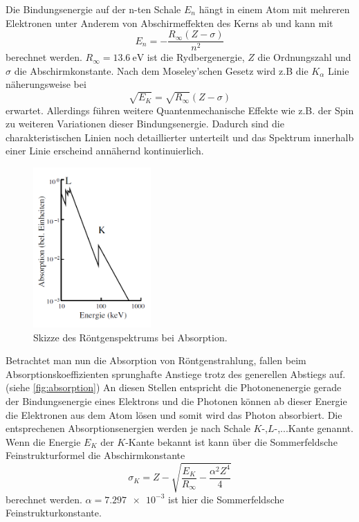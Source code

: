 Die Bindungsenergie auf der n-ten Schale $E_n$ hängt in einem Atom mit mehreren Elektronen unter Anderem von Abschirmeffekten des Kerns ab und kann mit
\begin{equation}
    E_n = -\frac{R_\infty(Z-\sigma)}{n^2}
\end{equation}
berechnet werden. 
$R_\infty=\SI{13.6}{\electronvolt}$ ist die Rydbergenergie, $Z$ die Ordnungszahl und $\sigma$ die Abschirmkonstante.\cite{V602}
Nach dem Moseley'schen Gesetz wird z.B die $K_\alpha$ Linie näherungsweise bei
\begin{equation}
    \sqrt{E_K} = \sqrt{R_\infty}(Z-\sigma)
    \label{eq:moseley}
\end{equation}
erwartet.
Allerdings führen weitere Quantenmechanische Effekte wie z.B. der Spin zu weiteren Variationen dieser Bindungsenergie.
Dadurch sind die charakteristischen Linien noch detaillierter unterteilt und das Spektrum innerhalb einer Linie erscheind annähernd kontinuierlich.

\begin{figure}
    \centering
    \includegraphics[width=0.4\textwidth]{images/absorption.png}
    \caption{Skizze des Röntgenspektrums bei Absorption.\cite{V602}}
    \label{fig:absorption}
\end{figure}

Betrachtet man nun die Absorption von Röntgenstrahlung, fallen beim Absorptionskoeffizienten sprunghafte Anstiege trotz des generellen Abstiegs auf.(siehe \autoref{fig:absorption})
An diesen Stellen entspricht die Photonenenergie gerade der Bindungsenergie eines Elektrons und die Photonen können ab dieser Energie die Elektronen aus dem Atom lösen und somit wird das Photon absorbiert.
Die entsprechenen Absorptionsenergien werden je nach Schale $K$-,$L$-,...Kante genannt.
Wenn die Energie $E_K$ der $K$-Kante bekannt ist kann über die Sommerfeldsche Feinstrukturformel die Abschirmkonstante 
\begin{equation}
    \sigma_K = Z - \sqrt{\frac{E_K}{R_\infty}-\frac{\alpha^2Z^4}{4}}
    \label{eq:abschirm}
\end{equation}
berechnet werden. $\alpha=\num{7.297e-3}$ ist hier die Sommerfeldsche Feinstrukturkonstante.\cite{physics_constants}

